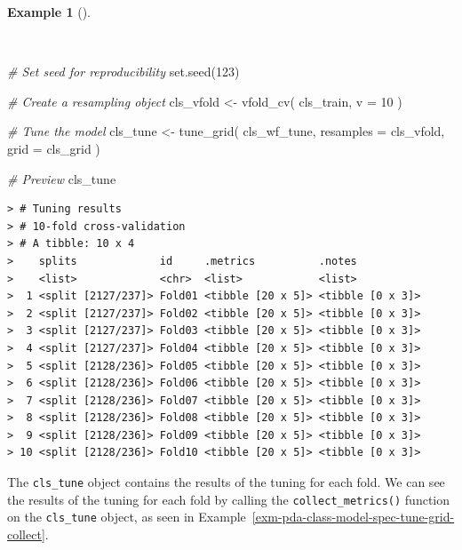 \documentclass[
  letterpaper,
  DIV=11,
  numbers=noendperiod]{scrreprt}
\newenvironment{Shaded}{\begin{snugshade}}{\end{snugshade}}
\newcommand{\AttributeTok}[1]{\textcolor[rgb]{0.00,0.00,0.00}{#1}}
\newcommand{\CommentTok}[1]{\textcolor[rgb]{0.00,0.00,0.00}{\textit{#1}}}
\newcommand{\DecValTok}[1]{\textcolor[rgb]{0.00,0.00,0.00}{#1}}
\newcommand{\FunctionTok}[1]{\textcolor[rgb]{0.00,0.00,0.00}{#1}}
\newcommand{\NormalTok}[1]{\textcolor[rgb]{0.00,0.00,0.00}{#1}}
\newcommand{\OtherTok}[1]{\textcolor[rgb]{0.00,0.00,0.00}{#1}}
\theoremstyle{definition}
\newtheorem{example}{Example}[chapter]
\theoremstyle{remark}
\begin{document}
\begin{example}[]\protect\hypertarget{exm-pda-class-model-spec-tune-grid-cv}{}\label{exm-pda-class-model-spec-tune-grid-cv}

~

\begin{Shaded}
\begin{Highlighting}[]
\CommentTok{\# Set seed for reproducibility}
\FunctionTok{set.seed}\NormalTok{(}\DecValTok{123}\NormalTok{)}

\CommentTok{\# Create a resampling object}
\NormalTok{cls\_vfold }\OtherTok{\textless{}{-}}
  \FunctionTok{vfold\_cv}\NormalTok{(}
\NormalTok{    cls\_train,}
    \AttributeTok{v =} \DecValTok{10}
\NormalTok{    )}

\CommentTok{\# Tune the model}
\NormalTok{cls\_tune }\OtherTok{\textless{}{-}}
  \FunctionTok{tune\_grid}\NormalTok{(}
\NormalTok{    cls\_wf\_tune,}
    \AttributeTok{resamples =}\NormalTok{ cls\_vfold,}
    \AttributeTok{grid =}\NormalTok{ cls\_grid}
\NormalTok{    )}

\CommentTok{\# Preview}
\NormalTok{cls\_tune}
\end{Highlighting}
\end{Shaded}

\begin{verbatim}
> # Tuning results
> # 10-fold cross-validation 
> # A tibble: 10 x 4
>    splits             id     .metrics          .notes          
>    <list>             <chr>  <list>            <list>          
>  1 <split [2127/237]> Fold01 <tibble [20 x 5]> <tibble [0 x 3]>
>  2 <split [2127/237]> Fold02 <tibble [20 x 5]> <tibble [0 x 3]>
>  3 <split [2127/237]> Fold03 <tibble [20 x 5]> <tibble [0 x 3]>
>  4 <split [2127/237]> Fold04 <tibble [20 x 5]> <tibble [0 x 3]>
>  5 <split [2128/236]> Fold05 <tibble [20 x 5]> <tibble [0 x 3]>
>  6 <split [2128/236]> Fold06 <tibble [20 x 5]> <tibble [0 x 3]>
>  7 <split [2128/236]> Fold07 <tibble [20 x 5]> <tibble [0 x 3]>
>  8 <split [2128/236]> Fold08 <tibble [20 x 5]> <tibble [0 x 3]>
>  9 <split [2128/236]> Fold09 <tibble [20 x 5]> <tibble [0 x 3]>
> 10 <split [2128/236]> Fold10 <tibble [20 x 5]> <tibble [0 x 3]>
\end{verbatim}

\end{example}

The \texttt{cls\_tune} object contains the results of the tuning for
each fold. We can see the results of the tuning for each fold by calling
the \texttt{collect\_metrics()} function on the \texttt{cls\_tune}
object, as seen in
Example~\ref{exm-pda-class-model-spec-tune-grid-collect}.
\end{document}
